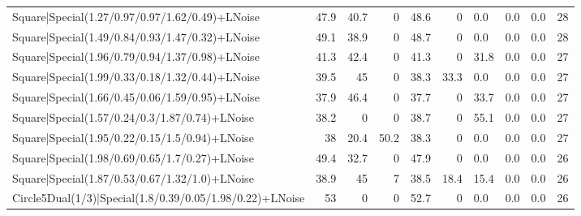 \begin{tabular}{lrrrrrlllr}
 Square|Special(1.27/0.97/0.97/1.62/0.49)+LNoise                 &            47.9 &            40.7 &             0   &            48.6 &            0   & 0.0             & 0.0            & 0.0            &           28 \\
 Square|Special(1.49/0.84/0.93/1.47/0.32)+LNoise                 &            49.1 &            38.9 &             0   &            48.7 &            0   & 0.0             & 0.0            & 0.0            &           28 \\
 Square|Special(1.96/0.79/0.94/1.37/0.98)+LNoise                 &            41.3 &            42.4 &             0   &            41.3 &            0   & 31.8            & 0.0            & 0.0            &           27 \\
 Square|Special(1.99/0.33/0.18/1.32/0.44)+LNoise                 &            39.5 &            45   &             0   &            38.3 &           33.3 & 0.0             & 0.0            & 0.0            &           27 \\
 Square|Special(1.66/0.45/0.06/1.59/0.95)+LNoise                 &            37.9 &            46.4 &             0   &            37.7 &            0   & 33.7            & 0.0            & 0.0            &           27 \\
 Square|Special(1.57/0.24/0.3/1.87/0.74)+LNoise                  &            38.2 &             0   &             0   &            38.7 &            0   & 55.1            & 0.0            & 0.0            &           27 \\
 Square|Special(1.95/0.22/0.15/1.5/0.94)+LNoise                  &            38   &            20.4 &            50.2 &            38.3 &            0   & 0.0             & 0.0            & 0.0            &           27 \\
 Square|Special(1.98/0.69/0.65/1.7/0.27)+LNoise                  &            49.4 &            32.7 &             0   &            47.9 &            0   & 0.0             & 0.0            & 0.0            &           26 \\
 Square|Special(1.87/0.53/0.67/1.32/1.0)+LNoise                  &            38.9 &            45   &             7   &            38.5 &           18.4 & 15.4            & 0.0            & 0.0            &           26 \\
 Circle5Dual(1/3)|Special(1.8/0.39/0.05/1.98/0.22)+LNoise        &            53   &             0   &             0   &            52.7 &            0   & 0.0             & 0.0            & 0.0            &           26 \\

\end{tabular}
